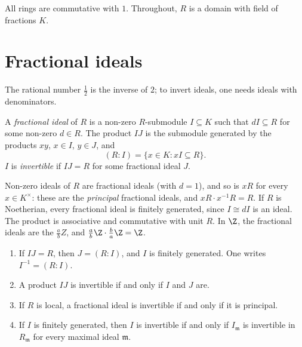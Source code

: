 All rings are commutative with $1$. Throughout, $R$ is a domain with field of fractions $K$.

\section{Fractional ideals}

The rational number $\frac12$ is the inverse of $2$; to invert ideals, one needs ideals with denominators.

\begin{definition}\label{def:fractional}
A \emph{fractional ideal} of $R$ is a non-zero $R$-submodule $I\subseteq K$ such that $dI\subseteq R$ for some non-zero $d\in R$. The product $IJ$ is the submodule generated by the products $xy$, $x\in I$, $y\in J$,
and
\[
(R:I)=\{x\in K: xI\subseteq R\}.
\]
$I$ is \emph{invertible} if $IJ=R$ for some fractional ideal $J$.
\end{definition}

Non-zero ideals of $R$ are fractional ideals (with $d=1$), and so is $xR$ for every $x\in K^\times$: these are the \emph{principal} fractional ideals, and $xR\cdot x^{-1}R=R$. If $R$ is Noetherian, every fractional
ideal is finitely generated, since $I\cong dI$ is an ideal. The product is associative and commutative with unit $R$. In $\Z$, the fractional ideals are the $\frac abZ$, and $\frac ab\Z\cdot\frac ba\Z=\Z$.

\begin{lemma}\label{lem:invertible}
\leavevmode
\begin{enumerate}[label=(\alph*)]
\item If $IJ=R$, then $J=(R:I)$, and $I$ is finitely generated. One writes $I^{-1}=(R:I)$.
\item A product $IJ$ is invertible if and only if $I$ and $J$ are.
\item If $R$ is local, a fractional ideal is invertible if and only if it is principal.
\item If $I$ is finitely generated, then $I$ is invertible if and only if $I_{\mathfrak m}$ is invertible in $R_{\mathfrak m}$ for every maximal ideal $\mathfrak m$.
\end{enumerate}
\end{lemma}

